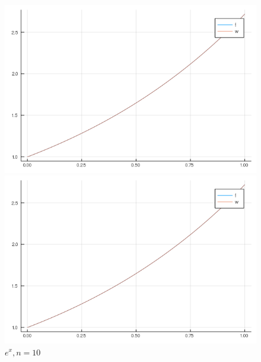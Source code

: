 \documentclass[12pt]{article}
\begin{document}
\begin{figure}[!htb]
  \includegraphics[width=\linewidth]{myplot_1_5.png}
  \caption{$e^x, n=5$}
\endminipage\hfill
{}
  \includegraphics[width=\linewidth]{myplot_1_10.png}
  \caption{$e^x, n=10$}
\endminipage
\end{figure}
\end{document}
